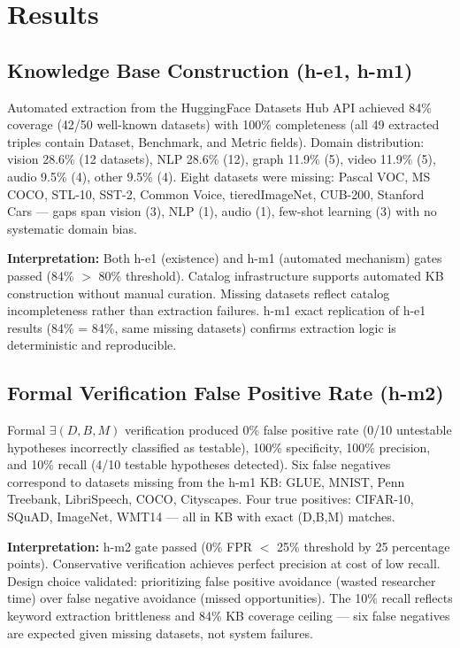 \section{Results}

\subsection{Knowledge Base Construction (h-e1, h-m1)}

Automated extraction from the HuggingFace Datasets Hub API achieved 84\% coverage (42/50 well-known datasets) with 100\% completeness (all 49 extracted triples contain Dataset, Benchmark, and Metric fields). Domain distribution: vision 28.6\% (12 datasets), NLP 28.6\% (12), graph 11.9\% (5), video 11.9\% (5), audio 9.5\% (4), other 9.5\% (4). Eight datasets were missing: Pascal VOC, MS COCO, STL-10, SST-2, Common Voice, tieredImageNet, CUB-200, Stanford Cars --- gaps span vision (3), NLP (1), audio (1), few-shot learning (3) with no systematic domain bias.

\textbf{Interpretation:} Both h-e1 (existence) and h-m1 (automated mechanism) gates passed (84\% $>$ 80\% threshold). Catalog infrastructure supports automated KB construction without manual curation. Missing datasets reflect catalog incompleteness rather than extraction failures. h-m1 exact replication of h-e1 results (84\% = 84\%, same missing datasets) confirms extraction logic is deterministic and reproducible.

\subsection{Formal Verification False Positive Rate (h-m2)}

Formal $\exists(D,B,M)$ verification produced 0\% false positive rate (0/10 untestable hypotheses incorrectly classified as testable), 100\% specificity, 100\% precision, and 10\% recall (4/10 testable hypotheses detected). Six false negatives correspond to datasets missing from the h-m1 KB: GLUE, MNIST, Penn Treebank, LibriSpeech, COCO, Cityscapes. Four true positives: CIFAR-10, SQuAD, ImageNet, WMT14 --- all in KB with exact (D,B,M) matches.

\textbf{Interpretation:} h-m2 gate passed (0\% FPR $<$ 25\% threshold by 25 percentage points). Conservative verification achieves perfect precision at cost of low recall. Design choice validated: prioritizing false positive avoidance (wasted researcher time) over false negative avoidance (missed opportunities). The 10\% recall reflects keyword extraction brittleness and 84\% KB coverage ceiling --- six false negatives are expected given missing datasets, not system failures.

